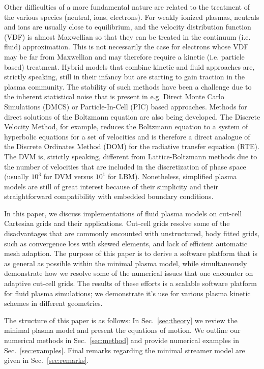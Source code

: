 \documentclass[3p]{elsarticle}
\begin{document}
Other difficulties of a more fundamental nature are related to the treatment of the various species (neutral, ions, electrons). For weakly ionized plasmas, neutrals and ions are usually close to equilibrium, and the velocity distribution function (VDF) is almost Maxwellian so that they can be treated in the continuum (i.e. fluid) approximation. This is not necessarily the case for electrons whose VDF may be far from Maxwellian and may therefore require a kinetic (i.e. particle based) treatment. Hybrid models that combine kinetic and fluid approaches are, strictly speaking, still in their infancy but are starting to gain traction in the plasma community. The stability of such methods have been a challenge due to the inherent statistical noise that is present in e.g. Direct Monte Carlo Simulations (DMCS) or Particle-In-Cell (PIC) based approaches. Methods for direct solutions of the Boltzmann equation are also being developed. The Discrete Velocity Method, for example, reduces the Boltzmann equation to a system of hyperbolic equations for a set of velocities and is therefore a direct analogue of the Discrete Ordinates Method (DOM) for the radiative transfer equation (RTE). The DVM is, strictly speaking, different from Lattice-Boltzmann methods due to the number of velocities that are included in the discretization of phase space (usually $10^3$ for DVM versus $10^1$ for LBM). Nonetheless, simplified plasma models are still of great interest because of their simplicity and their straightforward compatibility with embedded boundary conditions. 

In this paper, we discuss implementations of fluid plasma models on cut-cell Cartesian grids and their applications. Cut-cell grids resolve some of the disadvantages that are commonly encounted with unstructured, body fitted grids, such as convergence loss with skewed elements, and lack of efficient automatic mesh adaption. The purpose of this paper is to derive a software platform that is as general as possible within the minimal plasma model, while simultaneously demonstrate how we resolve some of the numerical issues that one encounter on adaptive cut-cell grids. The results of these efforts is a scalable software platform for fluid plasma simulations; we demonstrate it's use for various plasma kinetic schemes in different geometries. 

The structure of this paper is as follows: In Sec.~\ref{sec:theory} we review the minimal plasma model and present the equations of motion. We outline our numerical methods in Sec.~\ref{sec:method} and provide numerical examples in Sec.~\ref{sec:examples}. Final remarks regarding the minimal streamer model are given in Sec.~\ref{sec:remarks}.
\end{document}
